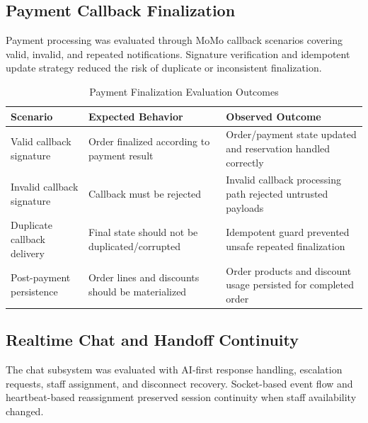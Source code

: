 \subsection{Payment Callback Finalization}

Payment processing was evaluated through MoMo callback scenarios covering valid, invalid, and repeated notifications. Signature verification and idempotent update strategy reduced the risk of duplicate or inconsistent finalization.

\begin{table}[H]
\centering
\caption{Payment Finalization Evaluation Outcomes}
\label{tab:discussion-payment-outcomes}
\begin{tabular}{|p{3.4cm}|p{4.2cm}|p{4.4cm}|}
\hline
\textbf{Scenario} & \textbf{Expected Behavior} & \textbf{Observed Outcome} \\
\hline
Valid callback signature & Order finalized according to payment result & Order/payment state updated and reservation handled correctly \\
\hline
Invalid callback signature & Callback must be rejected & Invalid callback processing path rejected untrusted payloads \\
\hline
Duplicate callback delivery & Final state should not be duplicated/corrupted & Idempotent guard prevented unsafe repeated finalization \\
\hline
Post-payment persistence & Order lines and discounts should be materialized & Order products and discount usage persisted for completed order \\
\hline
\end{tabular}
\end{table}

\subsection{Realtime Chat and Handoff Continuity}

The chat subsystem was evaluated with AI-first response handling, escalation requests, staff assignment, and disconnect recovery. Socket-based event flow and heartbeat-based reassignment preserved session continuity when staff availability changed.


